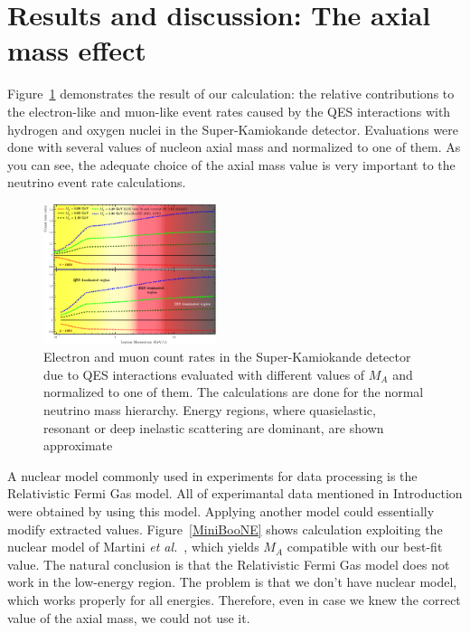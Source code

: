 \section{Results and discussion: The axial mass effect}
Figure~\ref{CountRate} demonstrates the result of our calculation: the relative contributions to the electron-like and muon-like event rates caused by the QES interactions with hydrogen and oxygen nuclei in the Super-Kamiokande detector. Evaluations were done with several values of nucleon axial mass and normalized to one of them. As you can see, the adequate choice of the axial mass value is very important to the neutrino event rate calculations.

\begin{figure}[h!]
\begin{center}
\includegraphics[width=0.45\textwidth]{./SK/Count_rate_ratio.eps}
\caption{\label{CountRate}Electron and muon count rates in the Super-Kamiokande detector due to QES interactions evaluated with different values of $M_A$ and normalized to one of them. The calculations are done for the normal neutrino mass hierarchy. Energy regions, where quasielastic, resonant or deep inelastic scattering are dominant, are shown approximate}
\end{center}
\end{figure}

A nuclear model commonly used in experiments for data processing is the Relativistic Fermi Gas model. All of experimantal data mentioned in Introduction were obtained by using this model. Applying another model could essentially modify extracted values. Figure~\ref{MiniBooNE} shows calculation exploiting the nuclear model of Martini \textit{et al.}~\cite{Martini:2011wp}, which yields $M_A$ compatible with our best-fit value. The natural conclusion is that the Relativistic Fermi Gas model does not work in the low-energy region. The problem is that we don't have nuclear model, which works properly for all energies. Therefore, even in case we knew the correct value of the axial mass, we could not use it.

